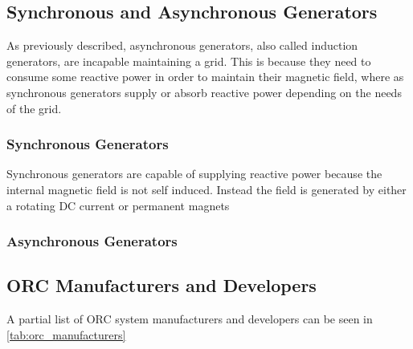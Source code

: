 
\subsection{Synchronous and Asynchronous Generators}
As previously described, asynchronous generators, also called induction generators, are incapable maintaining a grid. This is because they need to consume some reactive power in order to maintain their magnetic field, where as synchronous generators supply or absorb reactive power depending on the needs of the grid.

\subsubsection{Synchronous Generators}
Synchronous generators are capable of supplying reactive power because the internal magnetic field is not self induced. Instead the field is generated by either a rotating DC current or permanent magnets
\subsubsection{Asynchronous Generators}



\subsection{ORC Manufacturers and Developers}
A partial list of ORC system manufacturers and developers can be seen in \autoref{tab:orc_manufacturers}
 

